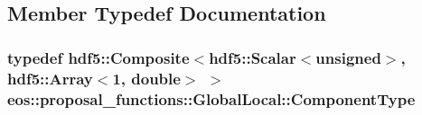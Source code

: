 \subsection{Member Typedef Documentation}
\hypertarget{classeos_1_1proposal__functions_1_1GlobalLocal_a8a0b2c1a71f2302bd4eeb95bc1d0041a}{
\subsubsection[{ComponentType}]{\setlength{\rightskip}{0pt plus 5cm}typedef {\bf hdf5::Composite}$<${\bf hdf5::Scalar}$<$unsigned$>$, {\bf hdf5::Array}$<$1, double$>$ $>$ {\bf eos::proposal\_\-functions::GlobalLocal::ComponentType}}}
\label{classeos_1_1proposal__functions_1_1GlobalLocal_a8a0b2c1a71f2302bd4eeb95bc1d0041a}


